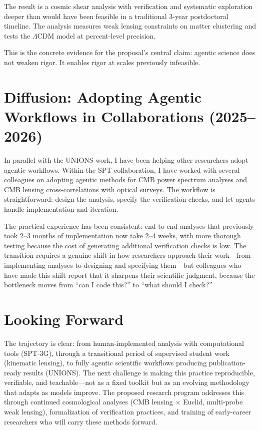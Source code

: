 \documentclass[11pt,a4paper]{article}
\begin{document}
The result is a cosmic shear analysis with verification and systematic exploration deeper than would have been feasible in a traditional 3-year postdoctoral timeline. The analysis measures weak lensing constraints on matter clustering and tests the $\Lambda$CDM model at percent-level precision.

This is the concrete evidence for the proposal's central claim: agentic science does not weaken rigor. It enables rigor at scales previously infeasible.

\section*{Diffusion: Adopting Agentic Workflows in Collaborations (2025--2026)}

In parallel with the UNIONS work, I have been helping other researchers adopt agentic workflows. Within the SPT collaboration, I have worked with several colleagues on adopting agentic methods for CMB power spectrum analyses and CMB lensing cross-correlations with optical surveys. The workflow is straightforward: design the analysis, specify the verification checks, and let agents handle implementation and iteration.

The practical experience has been consistent: end-to-end analyses that previously took 2--3 months of implementation now take 2--4 weeks, with more thorough testing because the cost of generating additional verification checks is low. The transition requires a genuine shift in how researchers approach their work---from implementing analyses to designing and specifying them---but colleagues who have made this shift report that it sharpens their scientific judgment, because the bottleneck moves from ``can I code this?'' to ``what should I check?''

\section*{Looking Forward}

The trajectory is clear: from human-implemented analysis with computational tools (SPT-3G), through a transitional period of supervised student work (kinematic lensing), to fully agentic scientific workflows producing publication-ready results (UNIONS). The next challenge is making this practice reproducible, verifiable, and teachable---not as a fixed toolkit but as an evolving methodology that adapts as models improve. The proposed research program addresses this through continued cosmological analyses (CMB lensing $\times$ Euclid, multi-probe weak lensing), formalization of verification practices, and training of early-career researchers who will carry these methods forward.
\end{document}
